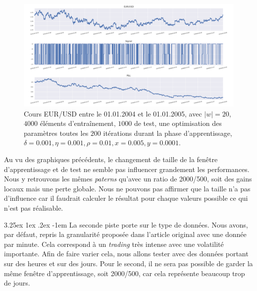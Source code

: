 \documentclass[a4paper, 11pt]{article}
\makeatletter
\renewcommand\paragraph{\@startsection{paragraph}{5}{\z@}%
  {3.25ex \@plus1ex \@minus.2ex}%
  {-1em}%
  {\normalfont\normalsize\bfseries}}
\makeatother
\begin{document}
\begin{figure}
		\centering
	\includegraphics[scale=0.5]{res/eursud_2004-2005_size_4000-1000}
	\caption{Cours EUR/USD entre le 01.01.2004 et le 01.01.2005, avec $|w| = 20$, $4000$ éléments d'entraînement, $1000$ de test, une optimisation des
		paramètres toutes les $200$ itérations durant la phase d'apprentissage, $\delta = 0.001, \eta=0.001,\rho=0.01, x = 0.005, y=0.0001$.}
\end{figure}
\clearpage

Au vu des graphiques précédents, le changement de taille de la fenêtre d'apprentissage et de test ne semble pas influencer grandement les performances. Nous y retrouvons les mêmes \textit{paterns} qu'avec un ratio de 2000/500, soit des gains locaux mais une perte globale. Nous ne pouvons pas affirmer que la taille n'a pas d'influence car il faudrait calculer le résultat pour chaque valeurs possible ce qui n'est pas réalisable.

\paragraph{}
La seconde piste porte sur le type de données. Nous avons, par défaut, repris la granularité proposée dans l'article original avec une donnée par minute. Cela correspond à un \textit{trading} très intense avec une volatilité importante. Afin de faire varier cela, nous allons tester avec des données portant sur des heures et sur des jours. Pour le second, il ne sera pas possible de garder la même fenêtre d'apprentissage, soit 2000/500, car cela représente beaucoup trop de jours.
\end{document}
